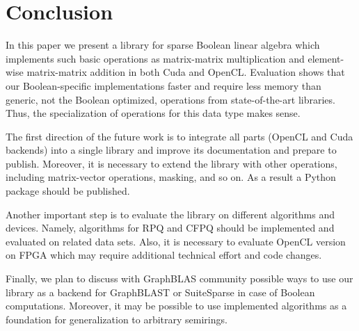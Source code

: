 \section{Conclusion}

In this paper we present a library for sparse Boolean linear algebra which implements such basic operations as matrix-matrix multiplication and element-wise matrix-matrix addition in both Cuda and OpenCL.
Evaluation shows that our Boolean-specific implementations faster and require less memory than generic, not the Boolean optimized, operations from state-of-the-art libraries. 
Thus, the specialization of operations for this data type makes sense. 

The first direction of the future work is to integrate all parts (OpenCL and Cuda backends) into a single library and improve its documentation and prepare to publish.
Moreover, it is necessary to extend the library with other operations, including matrix-vector operations, masking, and so on.
As a result a Python package should be published.

Another important step is to evaluate the library on different algorithms and devices.
Namely, algorithms for RPQ and CFPQ should be implemented and evaluated on related data sets.
Also, it is necessary to evaluate OpenCL version on FPGA which may require additional technical effort and code changes.

Finally, we plan to discuss with GraphBLAS community possible ways to use our library as a backend for GraphBLAST or SuiteSparse in case of Boolean computations.
Moreover, it may be possible to use implemented algorithms as a foundation for generalization to arbitrary semirings.
